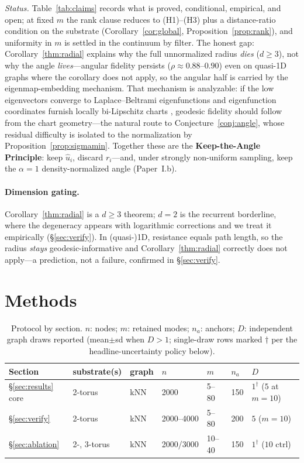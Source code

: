 \documentclass[review]{siamart220329}
\begin{document}
\noindent\emph{Status.} Table~\ref{tab:claims} records what is proved,
conditional, empirical, and open; at fixed $m$ the rank clause reduces to
(H1)--(H3) plus a distance-ratio condition on the substrate
(Corollary~\ref{cor:global}, Proposition~\ref{prop:rank}), and uniformity in
$m$ is settled in the continuum by filter. The honest gap:
Corollary~\ref{thm:radial} explains why the full unnormalized radius
\emph{dies} ($d\ge3$), not why the angle \emph{lives}---angular fidelity
persists ($\rho\approx0.88$--$0.90$) even on quasi-1D graphs where the
corollary does not apply, so the angular half is carried by the
eigenmap-embedding mechanism. That mechanism is analyzable: if the low
eigenvectors converge to Laplace--Beltrami eigenfunctions
\cite{belkin2007,garciatrillos2018} and eigenfunction coordinates furnish
locally bi-Lipschitz charts \cite{jones2010}, geodesic fidelity should follow
from the chart geometry---the natural route to Conjecture~\ref{conj:angle}, whose
residual difficulty is isolated to the normalization by
Proposition~\ref{prop:sigmamin}. Together these are the
\textbf{Keep-the-Angle Principle}: keep $\hat u_i$, discard $r_i$---and, under
strongly non-uniform sampling, keep the $\alpha{=}1$ density-normalized angle
(Paper~I.b).

\paragraph{Dimension gating.} Corollary~\ref{thm:radial} is a $d\ge3$
theorem; $d=2$ is the recurrent borderline, where the degeneracy appears with
logarithmic corrections and we treat it empirically (\S\ref{sec:verify}).
In (quasi-)1D, resistance equals path length, so the radius \emph{stays}
geodesic-informative and Corollary~\ref{thm:radial} correctly does not apply---a
prediction, not a failure, confirmed in \S\ref{sec:verify}.

\section{Methods}\label{sec:methods}
\begin{table}[h]\footnotesize\centering
\caption{Protocol by section. $n$: nodes; $m$: retained modes; $n_a$: anchors;
$D$: independent graph draws reported (mean$\pm$sd when $D>1$; single-draw rows
marked $\dagger$ per the headline-uncertainty policy below).}
\label{tab:protocol}
\begin{tabular}{@{}lllllll@{}}
\toprule
Section & substrate(s) & graph & $n$ & $m$ & $n_a$ & $D$ \\
\midrule
\S\ref{sec:results} core & 2-torus & kNN & 2000 & 5--80 & 150 & $1^{\dagger}$ ($5$ at $m{=}10$) \\
\S\ref{sec:verify} & 2-torus & kNN & 2000--4000 & 5--80 & 200 & $5$ ($m{=}10$) \\
\S\ref{sec:ablation} & 2-, 3-torus & kNN & 2000/3000 & 10--40 & 150 & $1^{\dagger}$ ($10$ ctrl) \\
\bottomrule
\end{tabular}
\end{table}
\end{document}
